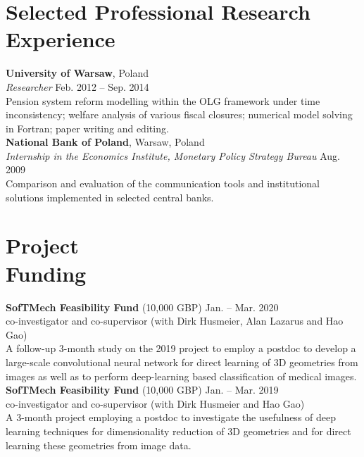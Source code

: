 \documentclass[margin,line]{resume}
\begin{document}
\begin{resume}
\vspace{-5mm}

\section{\mysidestyle Selected Professional Research Experience}
\textbf{University of Warsaw}, Poland \vspace{0mm}\\
\textsl{Researcher} \hfill Feb. 2012 -- Sep. 2014\\
Pension system reform modelling within the OLG framework under time inconsistency; welfare analysis of various fiscal closures; numerical model solving in Fortran; paper writing and editing.\vspace{1.5mm} \\
\textbf{National Bank of Poland}, Warsaw, Poland \\
\textsl{Internship in the Economics Institute, Monetary Policy Strategy Bureau} \hfill Aug. 2009\\
Comparison and evaluation of the communication tools and institutional solutions implemented in selected central banks.  


\vspace{-1mm}
 

\section{\mysidestyle Project\\ Funding}	
   	\textbf{SofTMech Feasibility Fund} (10,000 GBP)	\hfill Jan. -- Mar. 2020\\
     co-investigator and co-supervisor (with Dirk Husmeier, Alan Lazarus and Hao Gao)\\
    A follow-up 3-month study on the 2019 project to employ a postdoc to develop a large-scale convolutional neural network for direct learning of 3D geometries from images as well as  to perform deep-learning based classification of medical images.  \vspace{1.5mm}\\ 
   	\textbf{SofTMech Feasibility Fund} (10,000 GBP)	\hfill Jan. -- Mar. 2019\\
     co-investigator and co-supervisor (with Dirk Husmeier and Hao Gao) \\
    A 3-month project employing a postdoc to investigate the usefulness of deep learning techniques for dimensionality reduction of 3D geometries and for direct learning these geometries from image data.
    

\end{resume}
\end{document}
